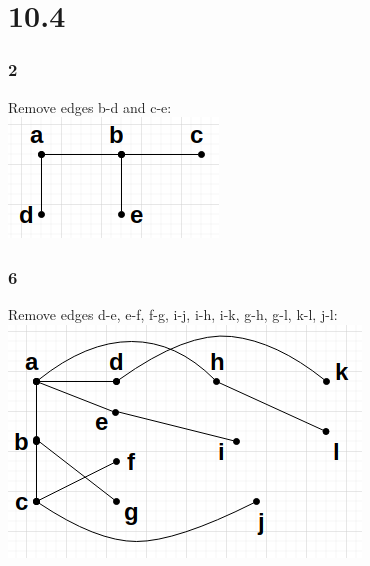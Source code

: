 \documentclass[12pt]{article}
\begin{document}
  \part*{10.4}
    \section*{2}
      \begin{center}
      Remove edges b-d and c-e:\\
        \includegraphics{spanningtree.png}
      \end{center}
    \section*{6}
      \begin{center}
      Remove edges d-e, e-f, f-g, i-j, i-h, i-k, g-h, g-l, k-l, j-l:\\
        \includegraphics{spanningtree6.png}
      \end{center}
\end{document}
